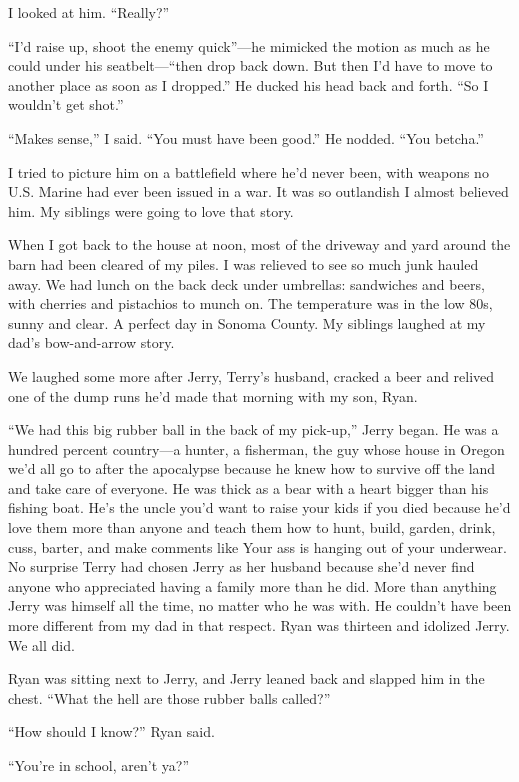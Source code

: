 \documentclass[12pt]{book}
\begin{document}
I looked at him. ``Really?''

``I'd raise up, shoot the enemy quick''---he mimicked the motion as much as he could under his seatbelt---``then drop back down. But then I'd have to move to another place as soon as I dropped.'' He ducked his head back and forth. ``So I wouldn't get shot.''

``Makes sense,'' I said. ``You must have been good.'' He nodded. ``You betcha.''

I tried to picture him on a battlefield where he'd never been, with weapons no U.S. Marine had ever been issued in a war. It was so outlandish I almost believed him. My siblings were going to love that story.

When I got back to the house at noon, most of the driveway and yard around the barn had been cleared of my piles. I was relieved to see so much junk hauled away. We had lunch on the back deck under umbrellas: sandwiches and beers, with cherries and pistachios to munch on. The temperature was in the low 80s, sunny and clear. A perfect day in Sonoma County. My siblings laughed at my dad's bow-and-arrow story.

We laughed some more after Jerry, Terry's husband, cracked a beer and relived one of the dump runs he'd made that morning with my son, Ryan.

``We had this big rubber ball in the back of my pick-up,'' Jerry began. He was a hundred percent country---a hunter, a fisherman, the guy whose house in Oregon we'd all go to after the apocalypse because he knew how to survive off the land and take care of everyone. He was thick as a bear with a heart bigger than his fishing boat. He's the uncle you'd want to raise your kids if you died because he'd love them more than anyone and teach them how to hunt, build, garden, drink, cuss, barter, and make comments like Your ass is hanging out of your underwear. No surprise Terry had chosen Jerry as her husband because she'd never find anyone who appreciated having a family more than he did. More than anything Jerry was himself all the time, no matter who he was with. He couldn't have been more different from my dad in that respect. Ryan was thirteen and idolized Jerry. We all did.

Ryan was sitting next to Jerry, and Jerry leaned back and slapped him in the chest. ``What the hell are those rubber balls called?''

``How should I know?'' Ryan said.

``You're in school, aren't ya?''
\end{document}
